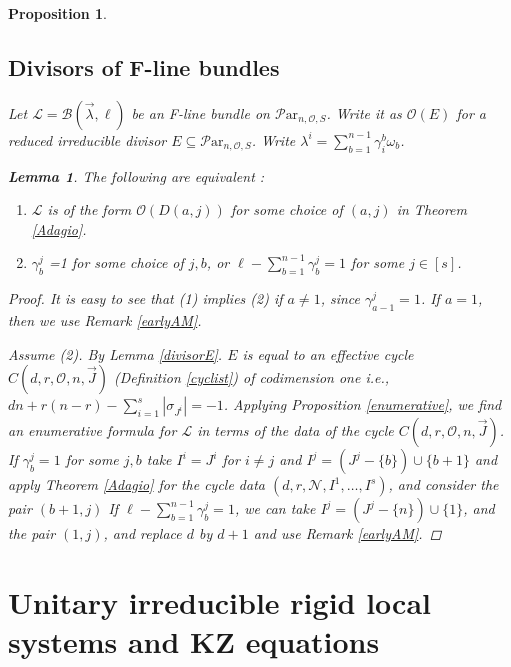 \documentclass[11pt]{amsart}
\newcommand\ml{\mathcal{L}}
\newcommand\mn{\mathcal{N}}
\newcommand\Par{\mathcal{P}\text{ar} }
\newtheorem{proposition}[theorem]{Proposition}
\newtheorem{lemma}[theorem]{Lemma}
\numberwithin{theorem}{subsection}
\begin{document}
{\begin{proposition}
\subsection{Divisors of F-line bundles}
Let $\ml=\mathcal{B}(\vec{\lambda},\ell)$ be an F-line bundle  on $\Par_{n,\mathcal{O},S}$. Write it as $\mathcal{O}(E)$ for a reduced irreducible divisor  $E\subseteq \Par_{n,\mathcal{O},S}$.
Write $\lambda^i=\sum_{b=1}^{n-1} \gamma_{i}^{b}\omega_b$.

\begin{lemma}\label{powercord}
The following are equivalent :
\begin{enumerate}
\item $\mathcal{L}$ is of the form $\mathcal{O}(D(a,j))$ for some choice of $(a,j)$ in Theorem \ref{Adagio}.
\item $\gamma^j_b$ =1 for some choice of $j,b$, or $\ell-\sum_{b=1}^{n-1} \gamma^j_b=1$ for some $j\in[s]$.
\end{enumerate}
\end{lemma}
\begin{proof}
It is easy to see that (1) implies (2) if $a\neq 1$, since  $\gamma^j_{a-1}=1$. If $a=1$, then we use Remark \ref{earlyAM}.

Assume (2). By Lemma \ref{divisorE}. $E$ is equal to an effective cycle $C(d,r,\mathcal{O},n,\vec{J})$ (Definition  \ref{cyclist})  of codimension one i.e., $dn  +r(n-r)-\sum_{i=1}^s |\sigma_{J^i}|=-1$. Applying Proposition \ref{enumerative}, we find an enumerative formula for $\ml$ in terms of the data of the cycle $C(d,r,\mathcal{O},n,\vec{J})$. If $\gamma^j_b=1$ for some $j,b$ take $I^i=J^i$ for $i\neq j$ and $I^j=(J^j-\{b\})\cup\{b+1\}$ and apply Theorem \ref{Adagio} for the cycle data $(d,r,\mn,I^1,\dots,I^s)$, and consider the pair $(b+1,j)$   If $\ell-\sum_{b=1}^{n-1} \gamma^j_b=1$, we can take $I^j=(J^j-\{n\})\cup\{1\}$, and the pair $(1,j)$, and replace $d$ by $d+1$ and use Remark \ref{earlyAM}.
\end{proof}



\section{Unitary irreducible rigid local systems and KZ equations}\label{EqKZ}

\end{proposition}}
\end{document}
